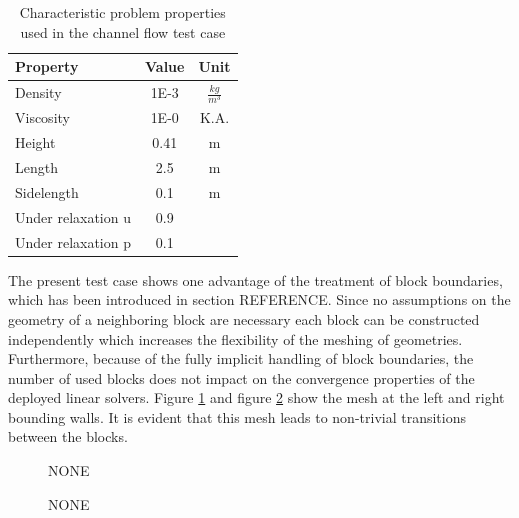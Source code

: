 \begin{table}[h!]\centering
{}
  \begin{tabular}{lcc}\toprule
    Property & Value & Unit \\
    \midrule
    \rowcolor{black!20} Density    & 1E-3 & $\frac{kg}{m^3}$      \\
    \rowcolor{black!00} Viscosity  & 1E-0 & K.A.  \\
    \rowcolor{black!20} Height     & 0.41 & m   \\
    \rowcolor{black!00} Length     & 2.5  & m  \\
    \rowcolor{black!20} Sidelength & 0.1  & m  \\
    \rowcolor{black!00} Under relaxation u & 0.9 &  \\
    \rowcolor{black!20} Under relaxation p & 0.1 &  \\
  \end{tabular}
  \caption{Characteristic problem properties used in the channel flow test case}
  \label{tab:channel}
\end{table}

The present test case shows one advantage of the treatment of block boundaries, which has been introduced in section REFERENCE. Since no assumptions on the geometry of a neighboring block are necessary each block can be constructed independently which increases the flexibility of the meshing of geometries. Furthermore, because of the fully implicit handling of block boundaries, the number of used blocks does not impact on the convergence properties of the deployed linear solvers. Figure \ref{fig:channel1} and figure \ref{fig:channel2} show the mesh at the left and right bounding walls. It is evident that this mesh leads to non-trivial transitions between the blocks.

\begin{figure}
  \centering
  \label{fig:channel1}
  
  \caption{NONE}
\end{figure}

\begin{figure}
  \centering
  \label{fig:channel2}
  
  \caption{NONE}
\end{figure}

%  


